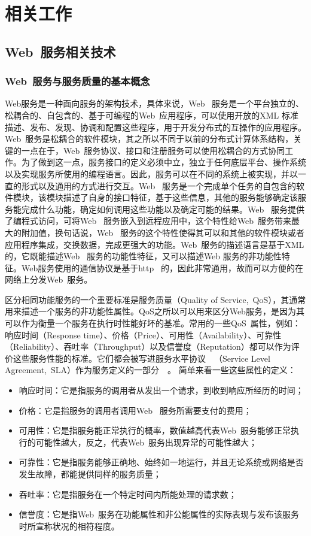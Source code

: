 \chapter{相关工作}

\section{Web~服务相关技术}

\subsection{Web~服务与服务质量的基本概念}
Web服务是一种面向服务的架构技术，具体来说，Web~ 服务是一个平台独立的、松耦合的、自包含的、基于可编程的Web~应用程序，可以使用开放的XML 标准描述、发布、发现、协调和配置这些程序，用于开发分布式的互操作的应用程序。Web~服务是松耦合的软件模块，其之所以不同于以前的分布式计算体系结构，关键的一点在于，Web~服务协议、接口和注册服务可以使用松耦合的方式协同工作。为了做到这一点，服务接口的定义必须中立，独立于任何底层平台、操作系统以及实现服务所使用的编程语言。因此，服务可以在不同的系统上被实现，并以一直的形式以及通用的方式进行交互。Web~ 服务是一个完成单个任务的自包含的软件模块，该模块描述了自身的接口特征，基于这些信息，其他的服务能够确定该服务能完成什么功能，确定如何调用这些功能以及确定可能的结果。Web~ 服务提供了编程式访问，可将Web~ 服务嵌入到远程应用中，这个特性给Web~服务带来最大的附加值，换句话说，Web~ 服务的这个特性使得其可以和其他的软件模块或者应用程序集成，交换数据，完成更强大的功能。Web~服务的描述语言是基于XML 的，它既能描述Web~ 服务的功能性特征，又可以描述Web 服务的非功能性特征。Web服务使用的通信协议是基于http~ 的，因此非常通用，故而可以方便的在网络上分发Web~服务。

区分相同功能服务的一个重要标准是服务质量（Quality of Service,~QoS），其通常用来描述一个服务的非功能性属性。QoS之所以可以用来区分Web服务，是因为其可以作为衡量一个服务在执行时性能好坏的基准。常用的一些QoS~属性，例如：响应时间（Response time）、价格（Price）、可用性（Availability）、可靠性（Reliability）、吞吐率（Throughput）以及信誉度（Reputation）都可以作为评价这些服务性能的标准。它们都会被写进服务水平协议~\cite{andrieux2007web}~（Service Level Agreement,~SLA）作为服务定义的一部分~\cite{zeng2003quality}~。 简单来看一些这些属性的定义：

\begin{itemize}
  \item 响应时间：它是指服务的调用者从发出一个请求，到收到响应所经历的时间；
  \item 价格：它是指服务的调用者调用Web~ 服务所需要支付的费用；
  \item 可用性：它是指服务能正常执行的概率，数值越高代表Web~服务能够正常执行的可能性越大，反之，代表Web~服务出现异常的可能性越大；
  \item 可靠性：它是指服务能够正确地、始终如一地运行，并且无论系统或网络是否发生故障，都能提供同样的服务质量；
  \item 吞吐率：它是指服务在一个特定时间内所能处理的请求数；
  \item 信誉度：它是指Web~服务在功能属性和非公能属性的实际表现与发布该服务时所宣称状况的相符程度。
\end{itemize}

